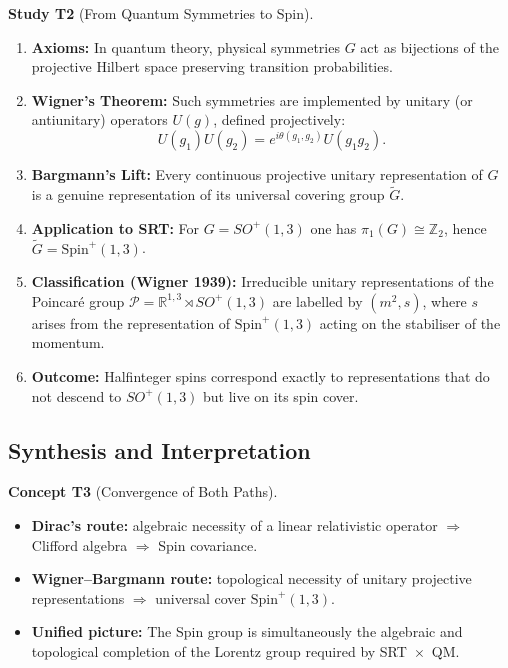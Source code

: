 \documentclass[10pt, letterpaper]{article}
\newcommand{\R}{\mathbb{R}}
\newcommand{\Z}{\mathbb{Z}}
\newcommand{\Spin}{\mathrm{Spin}}
\newcommand{\CustomHeading}[3]{%
  \par\medskip\noindent%
  \textbf{#1 #2} \textnormal{(#3)}.\enskip%
}
\newenvironment{STUD}[2]{\begin{unitbox}\CustomHeading{Study}{#1}{#2}}{\end{unitbox}}
\newenvironment{CONC}[2]{\begin{unitbox}\CustomHeading{Concept}{#1}{#2}}{\end{unitbox}}
\begin{document}
\begin{STUD}{T2}{From Quantum Symmetries to Spin}
\begin{enumerate}[label=\roman*)]
\item \textbf{Axioms:} In quantum theory, physical symmetries $G$ act as bijections of the projective Hilbert space preserving transition probabilities.

\item \textbf{Wigner’s Theorem:} Such symmetries are implemented by unitary (or antiunitary) operators $U(g)$, defined projectively:
\[
U(g_1)U(g_2) = e^{i\theta(g_1,g_2)}U(g_1g_2).
\]

\item \textbf{Bargmann’s Lift:} Every continuous projective unitary representation of $G$ is a genuine representation of its universal covering group $\widetilde G$.

\item \textbf{Application to SRT:} For $G=SO^+(1,3)$ one has $\pi_1(G)\cong\Z_2$, hence $\widetilde G=\Spin^+(1,3)$.

\item \textbf{Classification (Wigner 1939):}  
Irreducible unitary representations of the Poincaré group $\mathcal P=\R^{1,3}\rtimes SO^+(1,3)$ are labelled by $(m^2,s)$,  
where $s$ arises from the representation of $\Spin^+(1,3)$ acting on the stabiliser of the momentum.

\item \textbf{Outcome:}  
Halfinteger spins correspond exactly to representations that do not descend to $SO^+(1,3)$ but live on its spin cover.
\end{enumerate}
\end{STUD}

\subsection{Synthesis and Interpretation}

\begin{CONC}{T3}{Convergence of Both Paths}
\begin{itemize}
\item \textbf{Dirac’s route:} algebraic necessity of a linear relativistic operator $\Rightarrow$ Clifford algebra $\Rightarrow$ Spin covariance.
\item \textbf{Wigner–Bargmann route:} topological necessity of unitary projective representations $\Rightarrow$ universal cover $\Spin^+(1,3)$.
\item \textbf{Unified picture:} The Spin group is simultaneously the algebraic and topological completion of the Lorentz group required by SRT~$\times$~QM.
\end{itemize}
\end{CONC}
\end{document}
